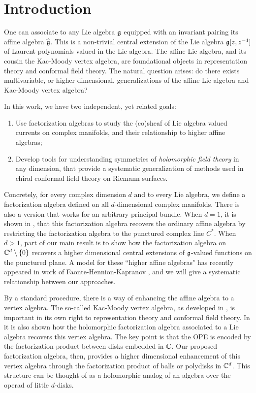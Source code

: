 \section*{Introduction}

One can associate to any Lie algebra $\mathfrak g$ equipped with an invariant pairing its affine algebra $\widehat{\mathfrak g}$. 
This is a non-trivial central extension of the Lie algebra $\mathfrak g[z,z^{-1}]$ of Laurent polynomials valued in the Lie algebra. 
The affine Lie algebra, and its cousin the Kac-Moody vertex algebra, are foundational objects in representation theory and conformal field theory. 
The natural question arises: do there exists multivariable, or higher dimensional, generalizations of the affine Lie algebra and Kac-Moody vertex algebra? 

In this work, we have two independent, yet related goals:
 
\begin{enumerate}
\item Use factorization algebras to study the (co)sheaf of Lie algebra valued currents on complex manifolds, and their relationship to higher affine algebras;
\item Develop tools for understanding symmetries of {\em holomorphic field theory} in any dimension, that provide a systematic generalization of methods used in chiral conformal field theory on Riemann surfaces.
\end{enumerate}

Concretely, for every complex dimension $d$ and to every Lie algebra, we define a factorization algebra defined on all $d$-dimensional complex manifolds. 
There is also a version that works for an arbitrary principal bundle. 
When $d=1$, it is shown in \cite{CG1}, that this factorization algebra recovers the ordinary affine algebra by restricting the factorization algebra to the punctured complex line $C^*$. 
When $d > 1$, part of our main result is to show how the factorization algebra on $\mathbb C^d \setminus \{0\}$ recovers a higher dimensional central extensions of $\mathfrak g$-valued functions on the punctured plane. 
A model for these ``higher affine algebras" has recently appeared in work of Faonte-Hennion-Kapranov \cite{FHK}, and we will give a systematic relationship between our approaches. 

By a standard procedure, there is a way of enhancing the affine algebra to a vertex algebra. 
The so-called Kac-Moody vertex algebra, as developed in \cite{IgorKM, KacVertex, BorcherdsVertex}, is important in its own right to representation theory and conformal field theory. 
In \cite{CG1} it is also shown how the holomorphic factorization algebra associated to a Lie algebra recovers this vertex algebra. 
The key point is that the OPE is encoded by the factorization product between disks embedded in $\mathbb C$. 
Our proposed factorization algebra, then, provides a higher dimensional enhancement of this vertex algebra through the factorization product of balls or polydisks in $\mathbb C^d$. 
This structure can be thought of as a holomorphic analog of an algebra over the operad of little $d$-disks.


